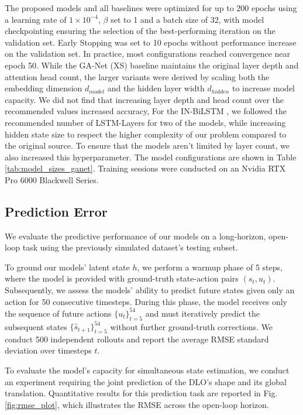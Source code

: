 \documentclass[letterpaper, 10 pt, conference]{ieeeconf}  %
\begin{document}
The proposed models and all baselines were optimized for up to 200 epochs using a learning rate of $1 \times 10^{-4}$, $\beta$ set to 1 and a batch size of 32, with model checkpointing ensuring the selection of the best-performing iteration on the validation set. Early Stopping was set to 10 epochs without performance increase on the validation set. In practice, most configurations reached convergence near epoch 50. While the GA-Net (XS) baseline maintains the original layer depth and attention head count, the larger variants were derived by scaling both the embedding dimension $d_{model}$ and the hidden layer width $d_{hidden}$ to increase model capacity. We did not find that increasing layer depth and head count over the recommended values increased accuracy, For the IN-BiLSTM \cite{yang_learning_2021}, we followed the recommended number of LSTM-Layers for two of the models, while increasing hidden state size to respect the higher complexity of our problem compared to the original source. To ensure that the models aren't limited by layer count, we also increased this hyperparameter. The model configurations are shown in Table \ref{tab:model_sizes_ganet}. Training sessions were conducted on an Nvidia RTX Pro 6000 Blackwell Series. 

\subsection{Prediction Error}

We evaluate the predictive performance of our models on a long-horizon, open-loop task using the previously simulated dataset's testing subset. 

To ground our models' latent state $h$, we perform a warmup phase of 5 steps, where the model is provided with ground-truth state-action pairs $(s_t, u_t)$. Subsequently, we assess the models' ability to predict future states given only an action for 50 consecutive timesteps. During this phase, the model receives only the sequence of future actions $\{u_t\}_{t=5}^{54}$ and must iteratively predict the subsequent states $\{\hat{s}_{t+1}\}_{t=5}^{54}$ without further ground-truth corrections. We conduct 500 independent rollouts and report the average RMSE standard deviation over timesteps $t$. 

To evaluate the model's capacity for simultaneous state estimation, we conduct an experiment requiring the joint prediction of the DLO's shape and its global translation. Quantitative results for this prediction task are reported in Fig. \ref{fig:rmse_plot}, which illustrates the RMSE across the open-loop horizon. 
\end{document}
